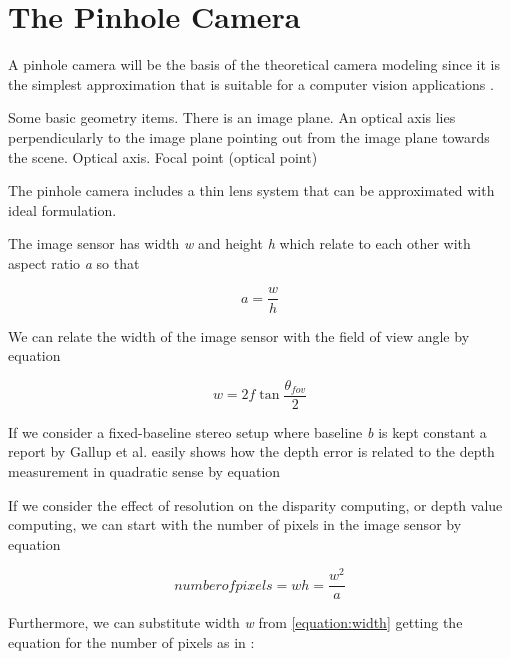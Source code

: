 \documentclass[12pt,a4paper,oneside,pdftex]{report}
\begin{document}
\section{The Pinhole Camera}

A pinhole camera will be the basis of the theoretical camera modeling since it is the simplest approximation that is suitable for a computer vision applications \cite{Sonka07}.

Some basic geometry items. There is an image plane. An optical axis lies perpendicularly to the image plane pointing out from the image plane towards the scene. 
Optical axis.
Focal point (optical point)













The pinhole camera includes a thin lens system that can be approximated with ideal formulation. 




The image sensor has width \emph{w} and height \emph{h} which relate to each other with aspect ratio \emph{a} so that

\begin{equation}
a = \frac{w}{h}
\end{equation}

We can relate the width of the image sensor with the field of view angle by equation

\begin{equation}
w = 2f\tan{\frac{\theta_{fov}}{2}}
\label{equation:width}
\end{equation}

If we consider a fixed-baseline stereo setup where baseline \emph{b} is kept constant a report by Gallup et al. easily shows how the depth error is related to the depth measurement in quadratic sense by equation

If we consider the effect of resolution on the disparity computing, or depth value computing, we can start with the number of pixels in the image sensor by equation

\begin{equation}
number of pixels = wh = \frac{w^2}{a}
\end{equation}

Furthermore, we can substitute width \emph{w} from \ref{equation:width} getting the equation for the number of pixels as in \cite{Gallup08}:
\end{document}
